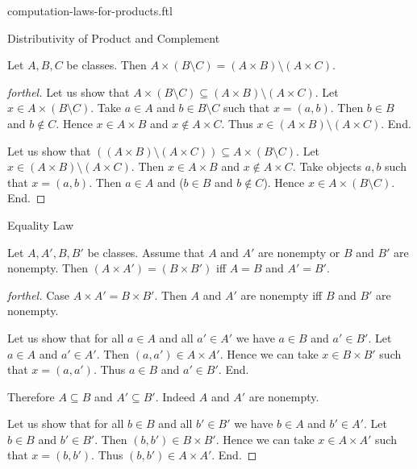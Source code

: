 \documentclass{naproche-library}
\begin{document}
\begin{smodule}[title=Computation Laws for Cartesian Products]{computation-laws-for-products.ftl}
\begin{sfragment}{Distributivity of Product and Complement}
  \begin{proposition}[forthel,id=FOUNDATIONS_05_3195639422779392]
    Let $A, B, C$ be classes.
    Then $A \times (B \setminus C) = (A \times B) \setminus (A \times C)$.
  \end{proposition}
  \begin{proof}[forthel]
    Let us show that $A \times (B \setminus C) \subseteq (A \times B) \setminus (A \times C)$.
      Let $x \in A \times (B \setminus C)$.
      Take $a \in A$ and $b \in B \setminus C$ such that $x = (a, b)$.
      Then $b \in B$ and $b \notin C$.
      Hence $x \in A \times B$ and $x \notin A \times C$.
      Thus $x \in (A \times B) \setminus (A \times C)$.
    End.

    Let us show that $((A \times B) \setminus (A \times C)) \subseteq A \times (B \setminus C)$. %
      Let $x \in (A \times B) \setminus (A \times C)$.
      Then $x \in A \times B$ and $x \notin A \times C$.
      Take objects $a, b$ such that $x = (a, b)$.
      Then $a \in A$ and ($b \in B$ and $b \notin C$).
      Hence $x \in A \times (B \setminus C)$.
    End.
  \end{proof}
\end{sfragment}

\begin{sfragment}{Equality Law}
  \begin{proposition}[forthel,id=FOUNDATIONS_05_2677218429894656]
    Let $A, A', B, B'$ be classes.
    Assume that $A$ and $A'$ are nonempty or $B$ and $B'$ are nonempty.
    Then $(A \times A') = (B \times B')$ iff $A = B$ and $A' = B'$.
  \end{proposition}
  \begin{proof}[forthel]
    Case $A \times A' = B \times B'$.
      Then $A$ and $A'$ are nonempty iff $B$ and $B'$ are nonempty.

      Let us show that for all $a \in A$ and all $a' \in A'$ we have $a \in B$ and $a' \in B'$.
        Let $a \in A$ and $a' \in A'$.
        Then $(a, a') \in A \times A'$.
        Hence we can take $x \in B \times B'$ such that $x = (a, a')$.
        Thus $a \in B$ and $a' \in B'$.
      End.

      Therefore $A \subseteq B$ and $A' \subseteq B'$.
      Indeed $A$ and $A'$ are nonempty.

      Let us show that for all $b \in B$ and all $b' \in B'$ we have $b \in A$ and $b' \in A'$.
        Let $b \in B$ and $b' \in B'$.
        Then $(b, b') \in B \times B'$.
        Hence we can take $x \in A \times A'$ such that $x = (b, b')$.
        Thus $(b, b') \in A \times A'$.
      End.


\end{proof}
\end{sfragment}
\end{smodule}
\end{document}
